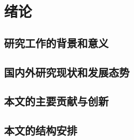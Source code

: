 
\chapter{绪论}

\section{研究工作的背景和意义}

\section{国内外研究现状和发展态势}

\section{本文的主要贡献与创新}

\section{本文的结构安排}
